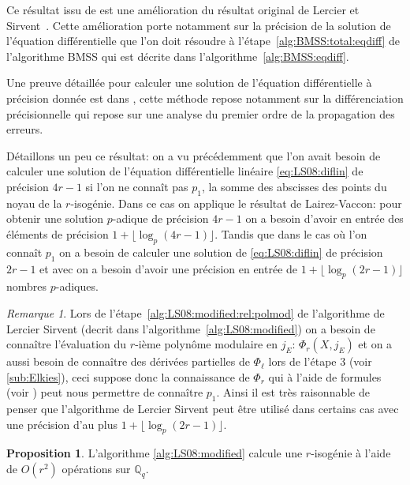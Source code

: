 \documentclass[10pt,a4paper]{book}
\theoremstyle{plain}
\theoremstyle{definition}
\theoremstyle{definition}
\theoremstyle{definition}
\theoremstyle{definition}
\newtheorem{prop}[thm]{Proposition}
\theoremstyle{definition}
\theoremstyle{remark}
\newtheorem{rem}[thm]{Remarque}
\theoremstyle{remark}
\theoremstyle{definition}
\begin{document}
Ce résultat issu de \cite[Theorem 2]{LairezVaccon16} est une amélioration du résultat original de Lercier et Sirvent~\cite{Lercier-Sirvent2008}. Cette amélioration porte notamment sur la précision de la solution de l'équation différentielle que l'on doit résoudre à l'étape~\ref{alg:BMSS:total:eqdiff} de l'algorithme BMSS  qui est décrite dans l'algorithme~\ref{alg:BMSS:eqdiff}.


Une preuve détaillée pour calculer une solution de l'équation différentielle à précision donnée est dans \cite{LairezVaccon16}, cette méthode repose notamment sur la différenciation précisionnelle qui repose sur une analyse du premier ordre de la propagation des erreurs. 

Détaillons un peu ce résultat: on a vu précédemment que l'on avait besoin de 
calculer une solution de l'équation différentielle linéaire 
\eqref{eq:LS08:diflin} de précision $4r-1$ si l'on ne connaît pas $p_1$, la 
somme des abscisses des points du noyau de la $r$-isogénie. Dans ce cas on 
applique le résultat de Lairez-Vaccon: pour obtenir une solution $p$-adique de 
précision $4 r-1$ on a besoin d'avoir en entrée des éléments de précision $ 1 +
\lfloor \log_p(4 r - 1) \rfloor $. Tandis que dans le cas où l'on connaît $p_1$
on a besoin de calculer une solution de \eqref{eq:LS08:diflin} de précision 
$2r - 1$ et avec \cite[Theorem 2]{LairezVaccon16} on a besoin d'avoir une 
précision en entrée de $ 1 + \lfloor \log_p(2 r - 1) \rfloor $ nombres 
$p$-adiques.

\begin{rem}
Lors de l'étape~\ref{alg:LS08:modified:rel:polmod} de l'algorithme de Lercier Sirvent (decrit dans l'algorithme~\ref{alg:LS08:modified}) on a besoin de connaître l'évaluation du $r$-ième polynôme modulaire en $j_E$: $\Phi_{r}(X,j_E)$ et on a aussi besoin de connaître des dérivées partielles de $\Phi_{\ell}$ lors de l'étape $3$ (voir \ref{sub:Elkies}), ceci suppose donc la connaissance de $\Phi_{r}$ qui à l'aide de formules (voir \cite[Theorem 17.22]{ehcc05}) peut nous permettre de connaître $p_1$. Ainsi il est très raisonnable de penser que l'algorithme de Lercier Sirvent peut être utilisé dans certains cas avec une précision d'au plus $1 + \lfloor \log_{p}(2r - 1) \rfloor$.
\end{rem}

\begin{prop}
L'algorithme \ref{alg:LS08:modified} calcule une $r$-isogénie à l'aide de $O(r^2)$  opérations sur $\mathbb{Q}_q$.
\end{prop}
\end{document}
